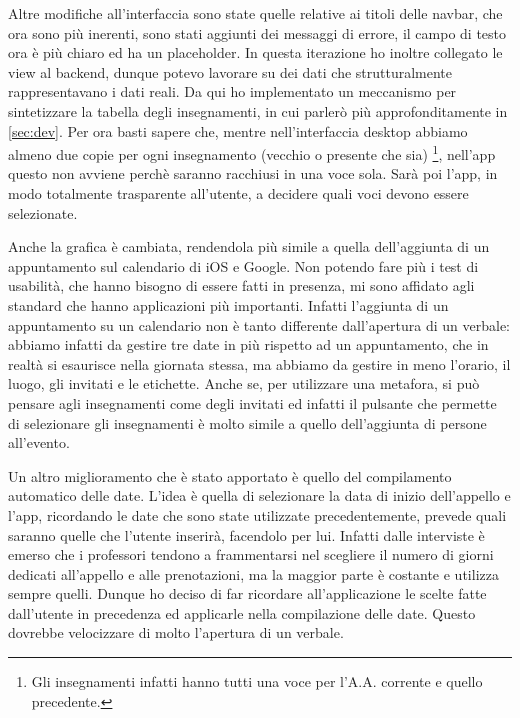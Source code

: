 \documentclass[Lau, oneside, noexaminfo]{sapthesis}%
\begin{document}
Altre modifiche all'interfaccia sono state quelle relative ai titoli delle navbar, che ora sono più inerenti, sono stati aggiunti dei messaggi di errore, il campo di testo ora è più chiaro ed ha un placeholder. In questa iterazione ho inoltre collegato le view al backend, dunque potevo lavorare su dei dati che strutturalmente rappresentavano i dati reali. Da qui ho implementato un meccanismo per sintetizzare la tabella degli insegnamenti, in cui parlerò più approfonditamente in \ref{sec:dev}. Per ora basti sapere che, mentre nell'interfaccia desktop abbiamo almeno due copie per ogni insegnamento (vecchio o presente che sia) \footnote{Gli insegnamenti infatti hanno tutti una voce per l'A.A. corrente e quello precedente.}, nell'app questo non avviene perchè saranno racchiusi in una voce sola. Sarà poi l'app, in modo totalmente trasparente all'utente, a decidere quali voci devono essere selezionate.

Anche la grafica è cambiata, rendendola più simile a quella dell'aggiunta di un appuntamento sul calendario di iOS e Google. Non potendo fare più i test di usabilità, che hanno bisogno di essere fatti in presenza, mi sono affidato agli standard che hanno applicazioni più importanti. Infatti l'aggiunta di un appuntamento su un calendario non è tanto differente dall'apertura di un verbale: abbiamo infatti da gestire tre date in più rispetto ad un appuntamento, che in realtà si esaurisce nella giornata stessa, ma abbiamo da gestire in meno l'orario, il luogo, gli invitati e le etichette. Anche se, per utilizzare una metafora, si può pensare agli insegnamenti come degli invitati ed infatti il pulsante che permette di selezionare gli insegnamenti è molto simile a quello dell'aggiunta di persone all'evento.

Un altro miglioramento che è stato apportato è quello del compilamento automatico delle date. L'idea è quella di selezionare la data di inizio dell'appello e l'app, ricordando le date che sono state utilizzate precedentemente, prevede quali saranno quelle che l'utente inserirà, facendolo per lui. Infatti dalle interviste è emerso che i professori tendono a frammentarsi nel scegliere il numero di giorni dedicati all'appello e alle prenotazioni, ma la maggior parte è costante e utilizza sempre quelli. Dunque ho deciso di far ricordare all'applicazione le scelte fatte dall'utente in precedenza ed applicarle nella compilazione delle date.
Questo dovrebbe velocizzare di molto l'apertura di un verbale. %
\end{document}
